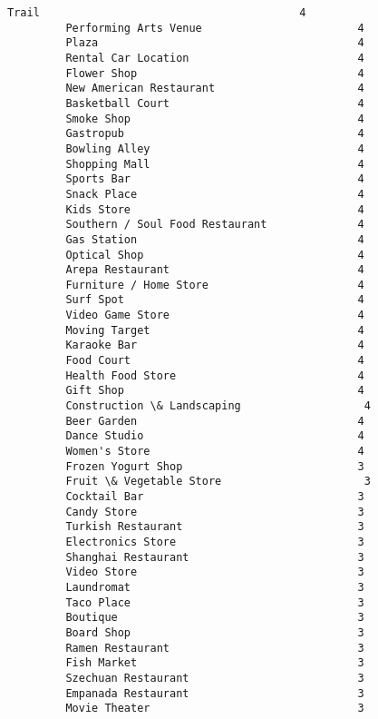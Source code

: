 \documentclass[11pt]{article}
\begin{document}
\begin{Verbatim}[commandchars=\\\{\}]
         Trail                                        4
         Performing Arts Venue                        4
         Plaza                                        4
         Rental Car Location                          4
         Flower Shop                                  4
         New American Restaurant                      4
         Basketball Court                             4
         Smoke Shop                                   4
         Gastropub                                    4
         Bowling Alley                                4
         Shopping Mall                                4
         Sports Bar                                   4
         Snack Place                                  4
         Kids Store                                   4
         Southern / Soul Food Restaurant              4
         Gas Station                                  4
         Optical Shop                                 4
         Arepa Restaurant                             4
         Furniture / Home Store                       4
         Surf Spot                                    4
         Video Game Store                             4
         Moving Target                                4
         Karaoke Bar                                  4
         Food Court                                   4
         Health Food Store                            4
         Gift Shop                                    4
         Construction \& Landscaping                   4
         Beer Garden                                  4
         Dance Studio                                 4
         Women's Store                                4
         Frozen Yogurt Shop                           3
         Fruit \& Vegetable Store                      3
         Cocktail Bar                                 3
         Candy Store                                  3
         Turkish Restaurant                           3
         Electronics Store                            3
         Shanghai Restaurant                          3
         Video Store                                  3
         Laundromat                                   3
         Taco Place                                   3
         Boutique                                     3
         Board Shop                                   3
         Ramen Restaurant                             3
         Fish Market                                  3
         Szechuan Restaurant                          3
         Empanada Restaurant                          3
         Movie Theater                                3

\end{Verbatim}
\end{document}
